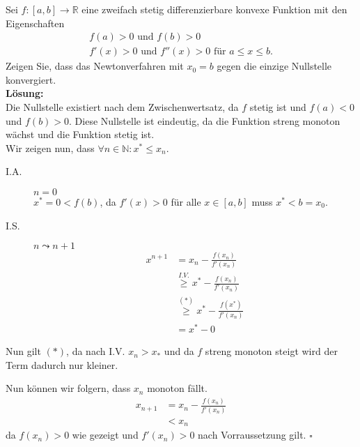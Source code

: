 \documentclass[11pt,a4paper,ngerman]{article}
\begin{document}
Sei $f : [a,b] \rightarrow \mathbb{R}$ eine zweifach stetig differenzierbare konvexe Funktion mit den Eigenschaften
$$\begin{array}{l}
    f(a) > 0 \text{ und } f(b) > 0\\
    f'(x) > 0 \text{ und } f''(x) > 0 \text{ für }a \leq x \leq b.
\end{array}$$
Zeigen Sie, dass das Newtonverfahren mit $x_0 = b$ gegen die einzige Nullstelle konvergiert.\\

\textbf{Lösung:}\\

Die Nullstelle existiert nach dem Zwischenwertsatz, da $f$ stetig ist und $f(a) < 0$ und $f(b) > 0$.
Diese Nullstelle ist eindeutig, da die Funktion streng monoton wächst und die Funktion stetig ist.\\


Wir zeigen nun, dass $\forall n\in \mathbb{N} : x^* \leq x_n$.
\begin{description}
    \item[I.A.] $n = 0$\\
        $x^* = 0 < f(b)$, da $f'(x) > 0$ für alle $x \in [a,b]$ muss $x^* < b = x_0$.\\
    \item[I.S.] $n \leadsto n+1$\\
        \begin{equation*}\begin{split}
            x^{n+1} &= x_n - \frac{f(x_n)}{f'(x_n)}\\
            &\stackrel{I.V.}{\geq} x^* - \frac{f(x_n)}{f'(x_n)}\\
            &\stackrel{(*)}{\geq} x^* - \frac{f(x^*)}{f'(x_n)}\\
            &= x^* - 0
        \end{split}\end{equation*}
\end{description}

Nun gilt $(*)$, da nach I.V. $x_n > x_*$ und da $f$ streng monoton steigt wird der Term dadurch nur kleiner.

Nun können wir folgern, dass $x_n$ monoton fällt.
\begin{equation*}\begin{split}
    x_{n+1} &= x_n - \frac{f(x_n)}{f'(x_n)}\\
        &< x_n
\end{split}\end{equation*}
da $f(x_n) > 0$ wie gezeigt und $f'(x_n) > 0$ nach Vorraussetzung gilt.
\mbox{} \hfill $\square$

\label{LastPage}
\end{document}
